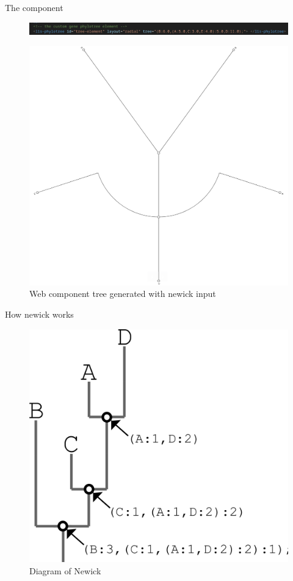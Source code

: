 \documentclass[aspectratio=169]{beamer}
\begin{document}
		\begin{frame}{The component}
			\begin{figure}
			\centering
			\includegraphics[width=0.7\linewidth]{imgs/web-component-call.png}
		\end{figure}
  \begin{figure}
			\includegraphics[height=0.4\linewidth]{imgs/radial-sample.png}
			\caption{Web component tree generated with newick input}
			\end{figure}
  \end{frame}
  \begin{frame}{How newick works}
  \begin{figure}
      \centering
      \includegraphics[width=0.5\linewidth]{imgs/newick-tree.png}
      \caption{Diagram of Newick}
      
  \end{figure}
		
			\end{frame}
			
\end{document}
